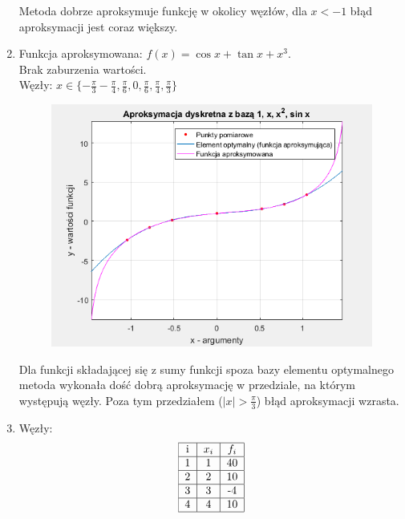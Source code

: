 \documentclass[12pt]{article}
\begin{document}
\begin{enumerate}[label=\textbf{Przykład \arabic*}]
		Metoda dobrze aproksymuje funkcję w okolicy węzłów, dla $x < -1$ błąd aproksymacji jest coraz większy.
		
		\item
		Funkcja aproksymowana: $f(x) = \cos x + \tan x + x^3$.\\
		Brak zaburzenia wartości.\\
		Węzły: $x \in \{-\frac{\pi}{3} -\frac{\pi}{4}, \frac{\pi}{6}, 0, \frac{\pi}{6}, \frac{\pi}{4}, \frac{\pi}{3} \}$
		
		\begin{figure}[H]
			\centering
			\includegraphics[scale=0.8]{images/example-4.png}
		\end{figure}
		
		Dla funkcji składającej się z sumy funkcji spoza bazy elementu optymalnego metoda wykonała dość dobrą aproksymację w przedziale, na którym występują węzły. Poza tym przedziałem ($|x| > \frac{\pi}{3}$) błąd aproksymacji wzrasta.
		
		\item
		Węzły:
		\begin{align*}
			\begin{tabular}{|c|c|c|}
				\hline
				i & $x_i$ & $f_i$ \\ \hline
				1 &  1  & 40  \\ \hline
				2 &  2  & 10  \\ \hline
				3 &  3  & -4  \\ \hline
				4 &  4  & 10  \\ \hline
			\end{tabular}
		\end{align*}
		

\end{enumerate}
\end{document}
